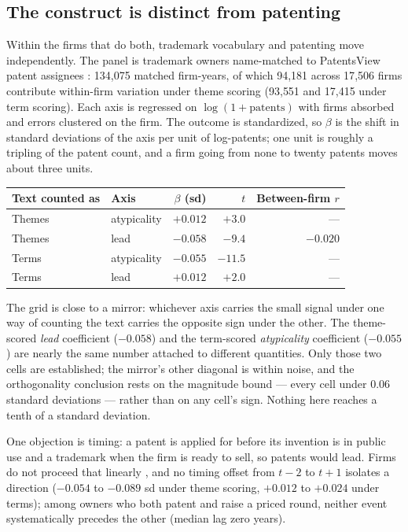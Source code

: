 \subsection{The construct is distinct from patenting}\label{sec:patent}

Within the firms that do both, trademark vocabulary and patenting move
independently. The panel is trademark owners name-matched to PatentsView
patent assignees \citep{PatentsView}: 134{,}075 matched firm-years,
of which 94{,}181 across 17{,}506 firms contribute within-firm variation
under theme scoring (93{,}551 and 17{,}415 under term scoring). Each
axis is regressed on $\log(1 + \mathrm{patents})$ with firms absorbed
and errors clustered on the firm. The outcome is standardized, so
$\beta$ is the shift in standard deviations of the axis per unit of
log-patents; one unit is roughly a tripling of the patent count, and a
firm going from none to twenty patents moves about three units.

\begin{center}\small
\begin{tabular}{llrrr}
\toprule
Text counted as & Axis & $\beta$ (sd) & $t$ & Between-firm $r$ \\
\midrule
Themes & atypicality & $+0.012$ & $+3.0$ & --- \\
Themes & lead        & $-0.058$ & $-9.4$ & $-0.020$ \\
Terms  & atypicality & $-0.055$ & $-11.5$ & --- \\
Terms  & lead        & $+0.012$ & $+2.0$ & --- \\
\bottomrule
\end{tabular}
\end{center}

\noindent The grid is close to a mirror: whichever axis carries the small
signal under one way of counting the text carries the opposite sign under
the other. The theme-scored \emph{lead} coefficient ($-0.058$) and the
term-scored \emph{atypicality} coefficient ($-0.055$) are nearly the same
number attached to different quantities. Only those two cells are
established; the mirror's other diagonal is within noise, and the
orthogonality conclusion rests on the magnitude bound --- every cell
under $0.06$ standard deviations --- rather than on any cell's sign.
Nothing here reaches a tenth of a standard deviation.

One objection is timing: a patent is applied for before its invention is
in public use and a trademark when the firm is ready to sell, so patents
would lead. Firms do not proceed that linearly \citep{Seip2018}, and no
timing offset from $t-2$ to $t+1$ isolates a direction ($-0.054$ to
$-0.089$ sd under theme scoring, $+0.012$ to $+0.024$ under terms);
among owners who both patent and raise a priced round, neither event
systematically precedes the other (median lag zero years).

